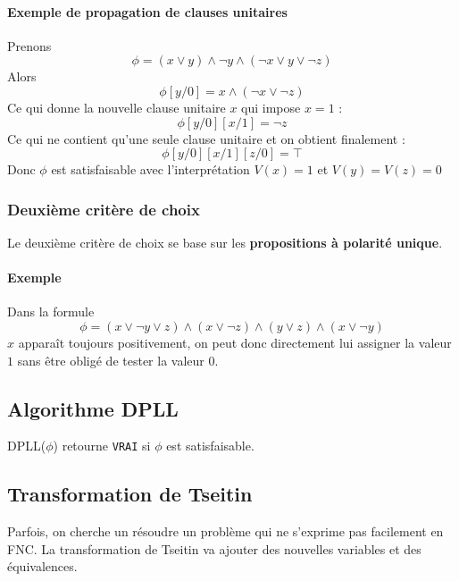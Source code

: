 \documentclass[a4paper]{article}
\begin{document}
  \paragraph{Exemple de propagation de clauses unitaires}
  Prenons $$\phi = (x\lor y) \land \lnot y \land (\lnot x \lor y \lor \lnot z)$$
  Alors $$ \phi[y/0] = x \land (\lnot x \lor \lnot z) $$
  Ce qui donne la nouvelle clause unitaire $x$ qui impose $ x = 1 $ :
  $$ \phi[y/0][x/1] =  \lnot z$$ 
  Ce qui ne contient qu'une seule clause unitaire et on obtient finalement :
  $$ \phi[y/0][x/1][z/0] = \top $$
  Donc $\phi$ est satisfaisable avec l'interprétation $V(x) = 1$ et $V(y) = V(z) = 0$

  \subsubsection{Deuxième critère de choix}
  Le deuxième critère de choix se base sur les \textbf{propositions à polarité unique}.

  \paragraph{Exemple} Dans la formule 
  $$\phi = (x \lor \lnot y \lor z) \land (x \lor \lnot z) \land (y \lor z) \land (x \lor \lnot y) $$
  $x$ apparaît toujours positivement, on peut donc directement lui assigner la valeur $1$
  sans être obligé de tester la valeur $0$.

  \subsection{Algorithme DPLL}
  DPLL($\phi$) retourne \texttt{VRAI} si $\phi$ est satisfaisable.

  \begin{algorithm}[H]
  \end{algorithm}

  \subsection{Transformation de Tseitin}
  Parfois, on cherche un résoudre un problème qui ne s'exprime pas facilement en FNC.
  La transformation de Tseitin va ajouter des nouvelles variables et des équivalences.
\end{document}
